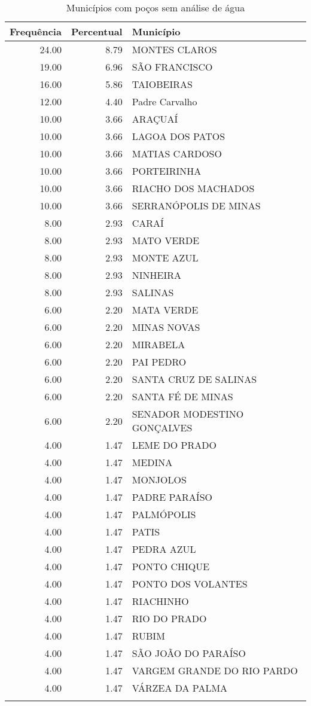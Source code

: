 \documentclass[a4paper, 12pt, openright, oneside, english, brazil, article]{abntex2}
\begin{document}
	\begin{scriptsize}
		\begin{longtable}{rrl}
			\caption{Municípios com poços sem análise de água} \\ 
			\hline
			Frequência & Percentual & Município \\ 
			\hline
			24.00 & 8.79 & MONTES CLAROS \\ 
			19.00 & 6.96 & SÃO FRANCISCO \\ 
			16.00 & 5.86 & TAIOBEIRAS \\ 
			12.00 & 4.40 & Padre Carvalho \\ 
			10.00 & 3.66 & ARAÇUAÍ \\ 
			10.00 & 3.66 & LAGOA DOS PATOS \\ 
			10.00 & 3.66 & MATIAS CARDOSO \\ 
			10.00 & 3.66 & PORTEIRINHA \\ 
			10.00 & 3.66 & RIACHO DOS MACHADOS \\ 
			10.00 & 3.66 & SERRANÓPOLIS DE MINAS \\ 
			8.00 & 2.93 & CARAÍ \\ 
			8.00 & 2.93 & MATO VERDE \\ 
			8.00 & 2.93 & MONTE AZUL \\ 
			8.00 & 2.93 & NINHEIRA \\ 
			8.00 & 2.93 & SALINAS \\ 
			6.00 & 2.20 & MATA VERDE \\ 
			6.00 & 2.20 & MINAS NOVAS \\ 
			6.00 & 2.20 & MIRABELA \\ 
			6.00 & 2.20 & PAI PEDRO \\ 
			6.00 & 2.20 & SANTA CRUZ DE SALINAS \\ 
			6.00 & 2.20 & SANTA FÉ DE MINAS \\ 
			6.00 & 2.20 & SENADOR MODESTINO GONÇALVES \\ 
			4.00 & 1.47 & LEME DO PRADO \\ 
			4.00 & 1.47 & MEDINA \\ 
			4.00 & 1.47 & MONJOLOS \\ 
			4.00 & 1.47 & PADRE PARAÍSO \\ 
			4.00 & 1.47 & PALMÓPOLIS \\ 
			4.00 & 1.47 & PATIS \\ 
			4.00 & 1.47 & PEDRA AZUL \\ 
			4.00 & 1.47 & PONTO CHIQUE \\ 
			4.00 & 1.47 & PONTO DOS VOLANTES \\ 
			4.00 & 1.47 & RIACHINHO \\ 
			4.00 & 1.47 & RIO DO PRADO \\ 
			4.00 & 1.47 & RUBIM \\ 
			4.00 & 1.47 & SÃO JOÃO DO PARAÍSO \\ 
			4.00 & 1.47 & VARGEM GRANDE DO RIO PARDO \\ 
			4.00 & 1.47 & VÁRZEA DA PALMA \\ 
			\hline
			\hline
			\label{motivo1}
		\end{longtable}
	\end{scriptsize}
	
\end{document}
